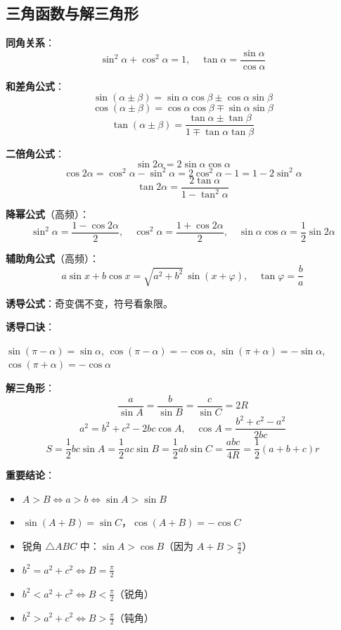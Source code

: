 \subsection{三角函数与解三角形}

\textbf{同角关系}：
\[
\sin^2\alpha + \cos^2\alpha = 1,\quad \tan\alpha = \frac{\sin\alpha}{\cos\alpha}
\]

\textbf{和差角公式}：
\[
\sin(\alpha\pm\beta) = \sin\alpha\cos\beta \pm \cos\alpha\sin\beta
\]
\[
\cos(\alpha\pm\beta) = \cos\alpha\cos\beta \mp \sin\alpha\sin\beta
\]
\[
\tan(\alpha\pm\beta) = \frac{\tan\alpha \pm \tan\beta}{1 \mp \tan\alpha\tan\beta}
\]

\textbf{二倍角公式}：
\[
\sin2\alpha = 2\sin\alpha\cos\alpha
\]
\[
\cos2\alpha = \cos^2\alpha - \sin^2\alpha = 2\cos^2\alpha - 1 = 1 - 2\sin^2\alpha
\]
\[
\tan2\alpha = \frac{2\tan\alpha}{1-\tan^2\alpha}
\]

\textbf{降幂公式}（高频）：
\[
\sin^2\alpha = \frac{1 - \cos2\alpha}{2},\quad \cos^2\alpha = \frac{1 + \cos2\alpha}{2},\quad \sin\alpha\cos\alpha = \frac12\sin2\alpha
\]

\textbf{辅助角公式}（高频）：
\[
a\sin x + b\cos x = \sqrt{a^2+b^2}\,\sin(x+\varphi),\quad \tan\varphi = \frac{b}{a}
\]

\textbf{诱导公式}：奇变偶不变，符号看象限。

\textbf{诱导口诀}：
\begin{center}
$\sin(\pi-\alpha)=\sin\alpha$,\; $\cos(\pi-\alpha)=-\cos\alpha$,\;
$\sin(\pi+\alpha)=-\sin\alpha$,\; $\cos(\pi+\alpha)=-\cos\alpha$
\end{center}

\textbf{解三角形}：
\[
\frac{a}{\sin A} = \frac{b}{\sin B} = \frac{c}{\sin C} = 2R
\]
\[
a^2 = b^2 + c^2 - 2bc\cos A,\quad
\cos A = \frac{b^2 + c^2 - a^2}{2bc}
\]
\[
S = \frac12 bc\sin A = \frac12 ac\sin B = \frac12 ab\sin C = \frac{abc}{4R} = \frac12 (a+b+c)r
\]

\textbf{重要结论}：
\begin{itemize}
  \item $A > B \iff a > b \iff \sin A > \sin B$
  \item $\sin(A+B) = \sin C$，$\cos(A+B) = -\cos C$
  \item 锐角 $\triangle ABC$ 中：$\sin A > \cos B$（因为 $A+B > \frac{\pi}{2}$）
  \item $b^2 = a^2 + c^2 \Leftrightarrow B = \frac{\pi}{2}$
  \item $b^2 < a^2 + c^2 \Leftrightarrow B < \frac{\pi}{2}$（锐角）
  \item $b^2 > a^2 + c^2 \Leftrightarrow B > \frac{\pi}{2}$（钝角）
\end{itemize}

